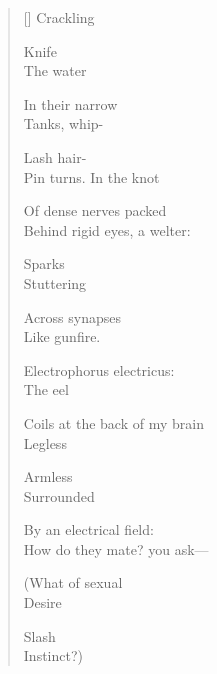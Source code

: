 \label{ch:eels}
\settowidth{\versewidth}{Coils at the back of my brain}
\begin{verse}[\versewidth]
Crackling

Knife\\
The water

In their narrow\\
Tanks, whip-

Lash hair-\\
Pin turns.     In the knot

Of dense nerves packed\\
Behind rigid eyes, a welter:

Sparks\\
Stuttering

Across synapses\\
Like gunfire.

Electrophorus electricus:\\
The eel

Coils at the back of my brain\\
Legless

Armless\\
Surrounded

By an electrical field:\\
How do they mate?  you ask---

(What of sexual\\
Desire

Slash\\
Instinct?)
\end{verse}
